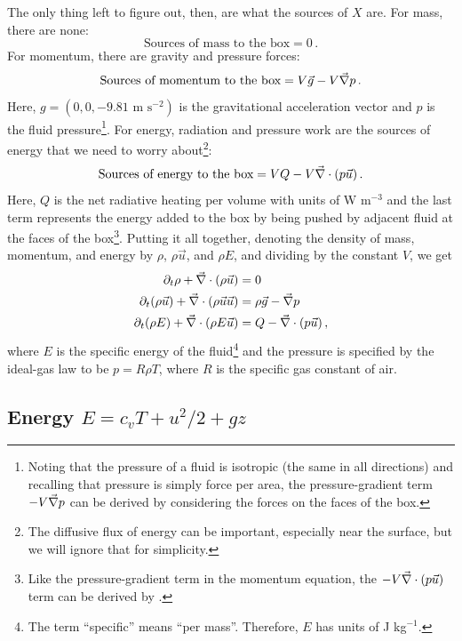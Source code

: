 \documentclass[12pt]{article}
\begin{document}
The only thing left to figure out, then, are what the sources of $X$ are.  For mass, there are none:
\[
\text{Sources of mass to the box} = 0 \, .
\]
For momentum, there are gravity and pressure forces:
\[
\text{Sources of momentum to the box} = V \vec{g} - V {\vec{\nabla}} p \, .
\]
Here, $g = (0,0,-9.81\text{ m s$^{-2}$})$ is the gravitational acceleration vector and $p$ is the fluid pressure\footnote{Noting that the pressure of a fluid is isotropic (the same in all directions) and recalling that pressure is simply force per area, the pressure-gradient term $-V {\vec{\nabla}} p$ can be derived by considering the forces on the faces of the box.}.  For energy, radiation and pressure work are the sources of energy that we need to worry about\footnote{The diffusive flux of energy can be important, especially near the surface, but we will ignore that for simplicity.}:
\[
\text{Sources of energy to the box} = V Q - V {\vec{\nabla}} \cdot (p \vec{u})\, .
\]
Here, $Q$ is the net radiative heating per volume with units of W m$^{-3}$ and the last term represents the energy added to the box by being pushed by adjacent fluid at the faces of the box\footnote{Like the pressure-gradient term in the momentum equation, the $-V {\vec{\nabla}} \cdot (p \vec{u})$ term can be derived by .}.  Putting it all together, denoting the density of mass, momentum, and energy by $\rho$, $\rho\vec{u}$, and $\rho E$, and dividing by the constant $V$, we get
\begin{align}
\partial_t \rho + {\vec{\nabla}} \cdot (\rho \vec{u}) &= 0 \label{mass_eulerian} \\
\partial_t (\rho \vec{u}) + {\vec{\nabla}} \cdot (\rho \vec{u} \vec{u}) &= \rho \vec{g} - {\vec{\nabla}} p \label{momentum_eulerian} \\
\partial_t (\rho E) + {\vec{\nabla}} \cdot (\rho E \vec{u}) &= Q - {\vec{\nabla}} \cdot (p \vec{u}) \, , \label{energy_eulerian}
\end{align}
where $E$ is the specific energy of the fluid\footnote{The term ``specific'' means ``per mass''.  Therefore, $E$ has units of J kg$^{-1}$.} and the pressure is specified by the ideal-gas law to be $p=R\rho T$, where $R$ is the specific gas constant of air.


\subsection{Energy $E = c_vT + u^2/2 + gz$}
\end{document}
